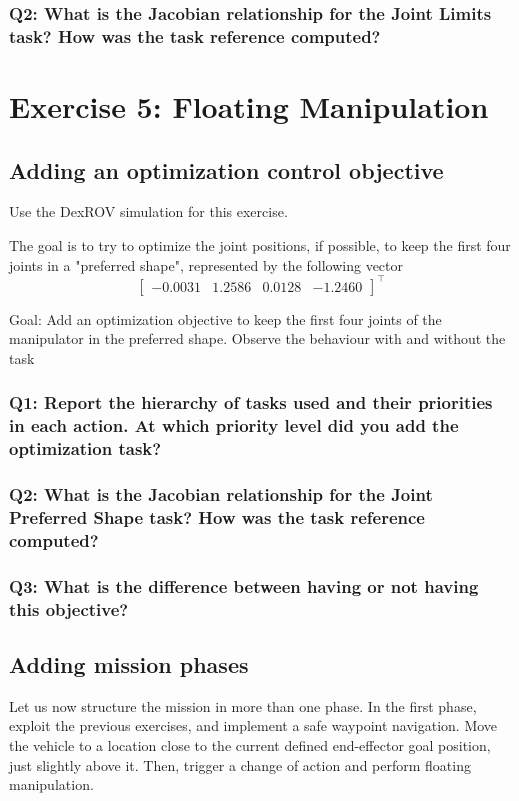 \documentclass{article}
\begin{document}
\subsubsection{Q2: What is the Jacobian relationship for the Joint Limits task? How was the task reference computed?}

\clearpage
\section{Exercise 5: Floating Manipulation}
\subsection{Adding an optimization control objective}
Use the DexROV simulation for this exercise.

The goal is to try to optimize the joint positions, if possible, to keep the first four joints in a "preferred shape", represented by the following vector
\begin{displaymath}
\begin{bmatrix}-0.0031 & 1.2586 & 0.0128 & -1.2460 \end{bmatrix}^\top
\end{displaymath}

Goal: Add an optimization objective to keep the first four joints of the manipulator in the preferred shape. Observe the behaviour with and without the task

\subsubsection{Q1: Report the hierarchy of tasks used and their priorities in each action. At which priority level did you add the optimization task?}

\subsubsection{Q2: What is the Jacobian relationship for the Joint Preferred Shape task? How was the task reference computed?}

\subsubsection{Q3: What is the difference between having or not having this objective?}

\subsection{Adding mission phases}
Let us now structure the mission in more than one phase. In the first phase, exploit the previous exercises, and implement a safe waypoint navigation. Move the vehicle to a location close to the current defined end-effector goal position, just slightly above it. Then, trigger a change of action and perform floating manipulation.
\end{document}
